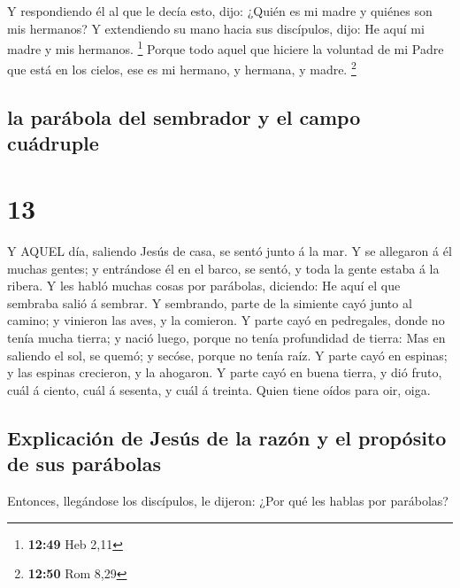  Y respondiendo él al que le decía esto, dijo: ¿Quién es mi
madre y quiénes son mis hermanos?  Y extendiendo su mano
hacia sus discípulos, dijo: He aquí mi madre y mis hermanos. \footnote{\textbf{12:49}
  Heb 2,11}  Porque todo aquel que hiciere la voluntad de
mi Padre que está en los cielos, ese es mi hermano, y hermana, y madre.
\footnote{\textbf{12:50} Rom 8,29}

\hypertarget{la-paruxe1bola-del-sembrador-y-el-campo-cuuxe1druple}{%
\subsection{la parábola del sembrador y el campo
cuádruple}\label{la-paruxe1bola-del-sembrador-y-el-campo-cuuxe1druple}}

\hypertarget{section-12}{%
\section{13}\label{section-12}}

 Y AQUEL día, saliendo Jesús de casa, se sentó junto á la
mar.  Y se allegaron á él muchas gentes; y entrándose él en
el barco, se sentó, y toda la gente estaba á la ribera.  Y
les habló muchas cosas por parábolas, diciendo: He aquí el que sembraba
salió á sembrar.  Y sembrando, parte de la simiente cayó
junto al camino; y vinieron las aves, y la comieron.  Y
parte cayó en pedregales, donde no tenía mucha tierra; y nació luego,
porque no tenía profundidad de tierra:  Mas en saliendo el
sol, se quemó; y secóse, porque no tenía raíz.  Y parte cayó
en espinas; y las espinas crecieron, y la ahogaron.  Y parte
cayó en buena tierra, y dió fruto, cuál á ciento, cuál á sesenta, y cuál
á treinta.  Quien tiene oídos para oir, oiga.

\hypertarget{explicaciuxf3n-de-jesuxfas-de-la-razuxf3n-y-el-propuxf3sito-de-sus-paruxe1bolas}{%
\subsection{Explicación de Jesús de la razón y el propósito de sus
parábolas}\label{explicaciuxf3n-de-jesuxfas-de-la-razuxf3n-y-el-propuxf3sito-de-sus-paruxe1bolas}}

 Entonces, llegándose los discípulos, le dijeron: ¿Por qué
les hablas por parábolas?

